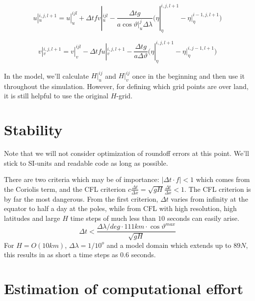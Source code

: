 \documentclass[a4paper]{article}
\begin{document}
\begin{equation}
  u|_u^{i,j,l+1} = u|_u^{ijl} 
    + \Delta t f v|_u^{ijl}
    - \frac{\Delta t g}{a\cos\vartheta|_u^j\Delta\lambda}
      \Biggl(\eta|_\eta^{i,j,l+1} - \eta|_\eta^{i-1,j,l+1}\Biggr)
\end{equation}

\begin{equation}
  v|_v^{i,j,l+1} = v|_v^{ijl} 
    - \Delta t f u|_v^{i,j,l+1} 
    - \frac{\Delta t g}{a\Delta\vartheta}
      \Biggl(\eta|_\eta^{i,j,l+1} - \eta|_\eta^{i,j-1,l+1}\Biggr)
\end{equation}

In the model, we'll calculate $H|_u^{ij}$ and $H|_v^{ij}$ once in the beginning and
then use it throughout the simulation. However, for defining which grid points are 
over land, it is still helpful to use the original $H$-grid.


\section{Stability}

Note that we will not consider optimization of roundoff errors at this point. We'll stick
to SI-units and readable code as long as possible.

There are two criteria which may be of importance: $|\Delta t\cdot f|<1$ which comes from the
Coriolis term, and the CFL criterion $c\frac{\Delta t}{\Delta x}=\sqrt{gH}\frac{\Delta t}{\Delta x}<1$. The CFL
criterion is by far the most dangerous. From the first criterion, $\Delta t$ varies from infinity
at the equator to half a day at the poles, while from CFL with high resolution, high latitudes and 
large $H$ time steps of much less than $10$ seconds can easily arise.
\begin{equation}
  \Delta t < \frac{\Delta\lambda/deg \cdot 111km \cdot \cos\vartheta^{max}}{\sqrt{gH}} 
\end{equation}
For $H=O(10km)$, $\Delta\lambda=1/10^{o}$ and a model domain which extends up to $89N$, this results in 
as short a time steps as $0.6$ seconds.


\section{Estimation of computational effort}
\end{document}
